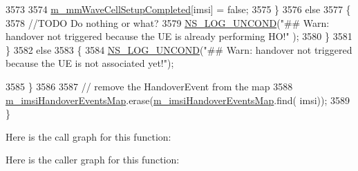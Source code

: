 \begin{DoxyCode}
3573 
3574       \hyperlink{classns3_1_1LteEnbRrc_ad19d6f4c123115e1d13e34609781ab20}{m\_mmWaveCellSetupCompleted}[imsi] = \textcolor{keyword}{false};    
3575     \}
3576     \textcolor{keywordflow}{else}
3577     \{
3578       \textcolor{comment}{//TODO Do nothing or what?}
3579       \hyperlink{log-macros-disabled_8h_a0b36e5e182b37194f85ef1c5e979fb2e}{NS\_LOG\_UNCOND}(\textcolor{stringliteral}{"## Warn: handover not triggered because the UE is already performing HO!"}
      );
3580     \}  
3581   \}
3582   \textcolor{keywordflow}{else}
3583   \{
3584     \hyperlink{log-macros-disabled_8h_a0b36e5e182b37194f85ef1c5e979fb2e}{NS\_LOG\_UNCOND}(\textcolor{stringliteral}{"## Warn: handover not triggered because the UE is not associated yet!"});   
       
3585   \}
3586 
3587   \textcolor{comment}{// remove the HandoverEvent from the map}
3588   \hyperlink{classns3_1_1LteEnbRrc_a6f703158e9a4ceaccbd1c5df7f5b0ba1}{m\_imsiHandoverEventsMap}.erase(\hyperlink{classns3_1_1LteEnbRrc_a6f703158e9a4ceaccbd1c5df7f5b0ba1}{m\_imsiHandoverEventsMap}.find(
      imsi));
3589 \}
\end{DoxyCode}


Here is the call graph for this function\+:




Here is the caller graph for this function\+:


